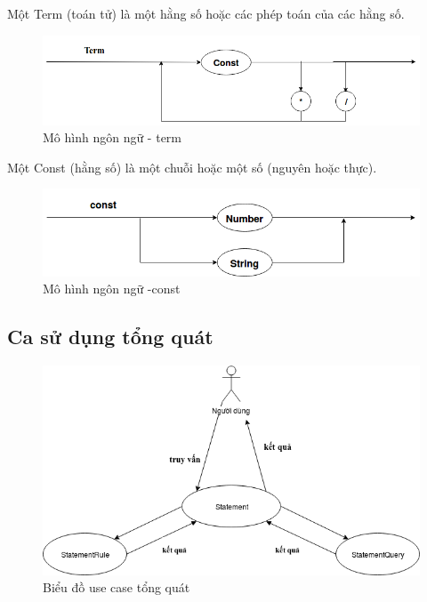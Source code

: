 Một Term (toán tử) là một hằng số hoặc các phép toán của các hằng số.
\begin{figure}[h!]
	\center
	\includegraphics[scale=0.4]{image/language_model-term}
	\caption{Mô hình ngôn ngữ - term}
\end{figure}
Một Const (hằng số) là một chuỗi hoặc một số (nguyên hoặc thực).
\begin{figure}[h!]
	\center
	\includegraphics[scale=0.4]{image/language_model-const}	
	\caption{Mô hình ngôn ngữ -const}
\end{figure}

\clearpage

\subsection{Ca sử dụng tổng quát}

\begin{figure}[h!]
	\center
	\includegraphics[scale=0.6]{image/language_diagram-use_case}
	\caption{Biểu đồ use case tổng quát}
\end{figure}


